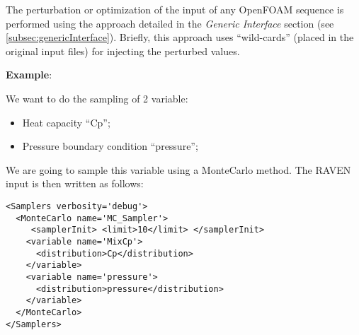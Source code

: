 \noindent The perturbation or optimization of the input of any OpenFOAM sequence is performed using the approach detailed in the \textit{Generic Interface} section (see \ref{subsec:genericInterface}). 
Briefly, this approach uses
 ``wild-cards'' (placed in the original input files) for injecting the perturbed values.

\textbf{Example}:

We want to do the sampling of 2 variable:
\begin{itemize}
  \item Heat capacity ``Cp'';
  \item Pressure boundary condition ``pressure'';
\end{itemize}

\noindent We are going to sample this variable using a MonteCarlo method.
The RAVEN input is then written as follows:

\begin{lstlisting}[style=XML,morekeywords={name,type,construction,lowerBound,steps,limit,initialSeed}]
<Samplers verbosity='debug'>
  <MonteCarlo name='MC_Sampler'>
     <samplerInit> <limit>10</limit> </samplerInit>
    <variable name='MixCp'>
      <distribution>Cp</distribution>
    </variable>
    <variable name='pressure'>
      <distribution>pressure</distribution>
    </variable>
  </MonteCarlo>
</Samplers>
\end{lstlisting}

